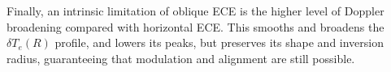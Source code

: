 \documentclass[aps,pra,twocolumn]{revtex4}
\begin{document}
Finally, an intrinsic limitation of oblique ECE is the higher level of 
Doppler broadening compared with horizontal ECE. 
This smooths and broadens the $\delta T_e(R)$ profile, and lowers its peaks, 
but preserves its shape and inversion radius, guaranteeing that modulation 
and alignment are still possible. 




%



%
\end{document}
